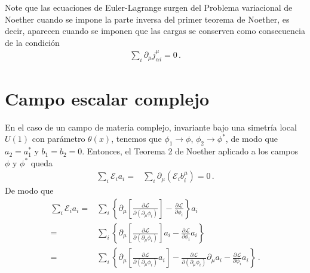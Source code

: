 Note que las ecuaciones de Euler-Lagrange surgen del Problema variacional de Noether cuando se impone la parte inversa del primer teorema de Noether, es decir, aparecen cuando se imponen que las cargas se conserven como consecuencia de la condición
\begin{align}
   \sum_i \partial_{\mu} j^{\mu}_{\alpha i}=0\,.
\end{align}



\section{Campo escalar complejo}

\begin{frame}
En el caso de un campo de materia complejo, invariante bajo una simetría local $U(1)$ con parámetro $\theta(x)$, tenemos que $\phi_1\to \phi$, $\phi_2\to \phi^{*}$, de modo que $a_2=a_1^{*}$ y $b_1=b_2=0$. Entonces, el Teorema 2  de Noether aplicado a los campos $\phi$ y $\phi^{*}$ queda
\begin{align}
  \label{eq:th2mf}
   \sum_i \mathcal{E}_ia_i=&\sum_i  \partial_{\mu}   \left(  \mathcal{E}_i b^{\mu}_i  \right) = 0\,.
\end{align}
De modo que
\begin{align}
 \sum_i \mathcal{E}_ia_i=&\sum_i \left\{ \partial_{\mu} \left[ \frac{\partial\mathcal{L}}{\partial(\partial_{\mu}\phi_i)}\right]-\frac{\partial\mathcal{L}}{\partial\phi_i} \right\}a_i \nonumber\\
=&\sum_i \left\{ \partial_{\mu} \left[ \frac{\partial\mathcal{L}}{\partial(\partial_{\mu}\phi_i)}\right]a_i-\frac{\partial\mathcal{L}}{\partial\phi_i}a_i \right\} \nonumber\\
=&\sum_i \left\{ \partial_{\mu} \left[ \frac{\partial\mathcal{L}}{\partial(\partial_{\mu}\phi_i)}a_i\right]-\frac{\partial\mathcal{L}}{\partial(\partial_{\mu}\phi_i)}\partial_{\mu}a_i-\frac{\partial\mathcal{L}}{\partial\phi_i}a_i \right\}\,.
\end{align}
\end{frame}

